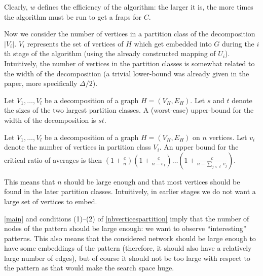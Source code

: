 \documentclass[a4paper,english,12pt,]{scrartcl}
\begin{document}
Clearly, $w$ defines the efficiency of the algorithm: the larger it is, the more times the algorithm must be run to get a fraps for $C$.



Now we consider the number of vertices in a partition class of the decomposition $|V_i|$. $V_i$ represents the set of vertices of $H$ which get embedded into $G$ during the $i$th stage of the algorithm (using the already constructed mapping of $U_i$). Intuitively, the number of vertices in the partition classes is somewhat related to the width of the decomposition (a trivial lower-bound was already given in the paper, more specifically $\Delta/2$).


\begin{lemma}\label{lemmawidth}
Let $V_1,\ldots,V_l$ be a decomposition of a graph $H = (V_H,E_H)$. Let $s$ and $t$ denote the sizes of the two largest partition classes. A (worst-case) upper-bound for the width of the decomposition is $st$.                                                                                                                                        

\end{lemma}
\begin{lemma}\label{nbverticespartition}
Let $V_1,\ldots,V_l$ be a decomposition of a graph $H = (V_H,E_H)$ on $n$ vertices. Let $v_i$ denote the number of vertices in partition class $V_i$. An upper bound for the critical ratio of averages is then $(1+\frac{c}{n})(1+\frac{c}{n-v_1}) \ldots (1+\frac{c}{n - \sum_{j<\ell} v_j})$.
\end{lemma}
This means that $n$ should be large enough and that most vertices should be found in the later partition classes. Intuitively, in earlier stages we do not want a large set of vertices to embed.

\autoref{main} and conditions (1)--(2) of \autoref{nbverticespartition} imply that the number of nodes of the pattern should be large enough: we want to observe ``interesting'' patterns. 
This also means that the considered network should be large enough to have some embeddings of the pattern (therefore, it should also have a relatively large number of edges), but of course it should not be too large with respect to the pattern as that would make the search space huge.
\end{document}
